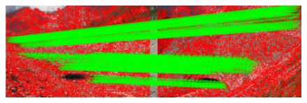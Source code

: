 \begin{figure}
{    \includegraphics[height=14cm]{stereo_sp+lg_matches}
  }
  \caption{}
  \label{fig:5:stereo_res_sparse}
\end{figure}


